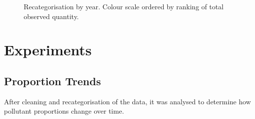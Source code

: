 \documentclass[10pt]{article}\usepackage[]{graphicx}\usepackage[]{color}
\newenvironment{knitrout}{}{} %
\begin{document}
\begin{figure}[H]
\begin{center}
\begin{knitrout}
\end{knitrout}
\caption {Recategorisation by year. Colour scale ordered by ranking of total observed quantity.}
\label{figB}
\end {center}
\end {figure}


















\pagebreak
\section{Experiments}



\subsection{Proportion Trends}
After cleaning and recategorisation of the data, it was analysed to determine how pollutant proportions change over time.\\
\end{document}
